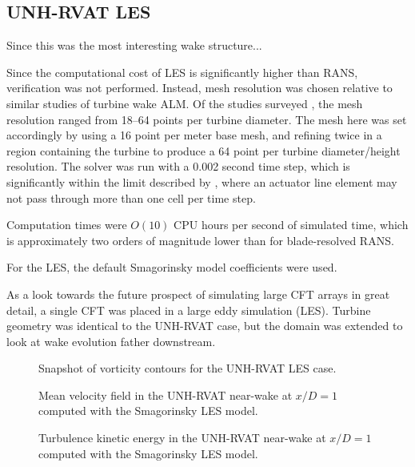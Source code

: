 \subsection{UNH-RVAT LES}

Since this was the most interesting wake structure...

Since the computational cost of LES is significantly higher than RANS,
verification was not performed. Instead, mesh resolution was chosen relative to
similar studies of turbine wake ALM. Of the studies surveyed
\cite{Shamsoddin2014,Archer2013,Martinez-Tossas2015a,Troldborg2007}, the mesh
resolution ranged from 18--64 points per turbine diameter. The mesh here was set
accordingly by using a 16 point per meter base mesh, and refining twice in a
region containing the turbine to produce a 64 point per turbine diameter/height
resolution. The solver was run with a 0.002 second time step, which is
significantly within the limit described by \cite{Martinez-Tossas2015}, where an
actuator line element may not pass through more than one cell per time step.

Computation times were $O(10)$ CPU hours per second of simulated time, which is
approximately two orders of magnitude lower than for blade-resolved RANS.

For the LES, the default Smagorinsky model coefficients were used. 

As a look towards the future prospect of simulating large CFT arrays in great
detail, a single CFT was placed in a large eddy simulation (LES). Turbine
geometry was identical to the UNH-RVAT case, but the domain was extended to look
at wake evolution father downstream.


\begin{figure}
    \caption{Snapshot of vorticity contours for the UNH-RVAT LES case.}
    
    \label{RVAT-ALM-LES-vorticity}
\end{figure}

\begin{figure}
    \centering
    
    \caption{Mean velocity field in the UNH-RVAT near-wake at $x/D=1$ computed
        with the Smagorinsky LES model.}
    
    \label{fig:RVAT-ALM-LES-meancontquiv}
\end{figure}

\begin{figure}
    \centering
    
    \caption{Turbulence kinetic energy in the UNH-RVAT near-wake at $x/D=1$
        computed with the Smagorinsky LES model.}
    
    \label{fig:RVAT-ALM-LES-kcont}
\end{figure}


